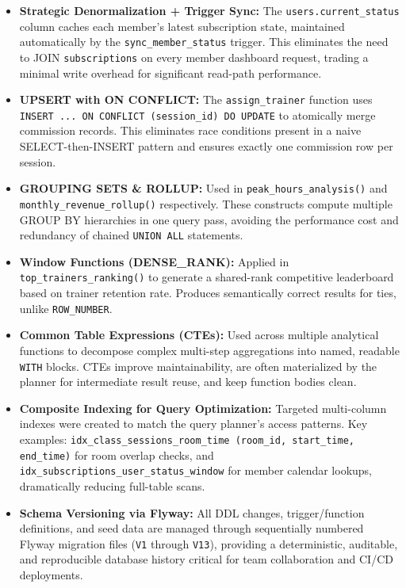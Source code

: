 \documentclass[12pt,a4paper]{article}
\begin{document}
\begin{itemize}[leftmargin=*]
    \item \textbf{Strategic Denormalization + Trigger Sync:} The \texttt{users.current\_status} column caches each member's latest subscription state, maintained automatically by the \texttt{sync\_member\_status} trigger. This eliminates the need to JOIN \texttt{subscriptions} on every member dashboard request, trading a minimal write overhead for significant read-path performance.

    \item \textbf{UPSERT with ON CONFLICT:} The \texttt{assign\_trainer} function uses \texttt{INSERT ... ON CONFLICT (session\_id) DO UPDATE} to atomically merge commission records. This eliminates race conditions present in a naive SELECT-then-INSERT pattern and ensures exactly one commission row per session.

    \item \textbf{GROUPING SETS \& ROLLUP:} Used in \texttt{peak\_hours\_analysis()} and \texttt{monthly\_revenue\_rollup()} respectively. These constructs compute multiple GROUP BY hierarchies in one query pass, avoiding the performance cost and redundancy of chained \texttt{UNION ALL} statements.

    \item \textbf{Window Functions (DENSE\_RANK):} Applied in \texttt{top\_trainers\_ranking()} to generate a shared-rank competitive leaderboard based on trainer retention rate. Produces semantically correct results for ties, unlike \texttt{ROW\_NUMBER}.

    \item \textbf{Common Table Expressions (CTEs):} Used across multiple analytical functions to decompose complex multi-step aggregations into named, readable \texttt{WITH} blocks. CTEs improve maintainability, are often materialized by the planner for intermediate result reuse, and keep function bodies clean.

    \item \textbf{Composite Indexing for Query Optimization:} Targeted multi-column indexes were created to match the query planner's access patterns. Key examples: \texttt{idx\_class\_sessions\_room\_time (room\_id, start\_time, end\_time)} for room overlap checks, and \texttt{idx\_subscriptions\_user\_status\_window} for member calendar lookups, dramatically reducing full-table scans.

    \item \textbf{Schema Versioning via Flyway:} All DDL changes, trigger/function definitions, and seed data are managed through sequentially numbered Flyway migration files (\texttt{V1} through \texttt{V13}), providing a deterministic, auditable, and reproducible database history critical for team collaboration and CI/CD deployments.
\end{itemize}
\end{document}
